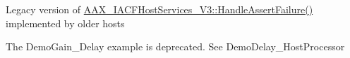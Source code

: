 \begin{DoxyRefList}
\item[Member \mbox{\hyperlink{a01713_a49111de18abd12b671ae16138e244af3}{A\+A\+X\+\_\+\+I\+A\+C\+F\+Host\+Services::Assert}} (const char $\ast$i\+File, int32\+\_\+t i\+Line, const char $\ast$i\+Note)=0]\label{a00788__deprecated000014}%
%
Legacy version of \mbox{\hyperlink{a01721_aaaddbd89dd3d6dd2e9e9def5b99c579f}{A\+A\+X\+\_\+\+I\+A\+C\+F\+Host\+Services\+\_\+\+V3\+::\+Handle\+Assert\+Failure()}} implemented by older hosts 
\item[Module \mbox{\hyperlink{a00848}{Example\+Plug\+Ins}} ]\label{a00788__deprecated000001}%
%
The Demo\+Gain\+\_\+\+Delay example is deprecated. See Demo\+Delay\+\_\+\+Host\+Processor
\end{DoxyRefList}